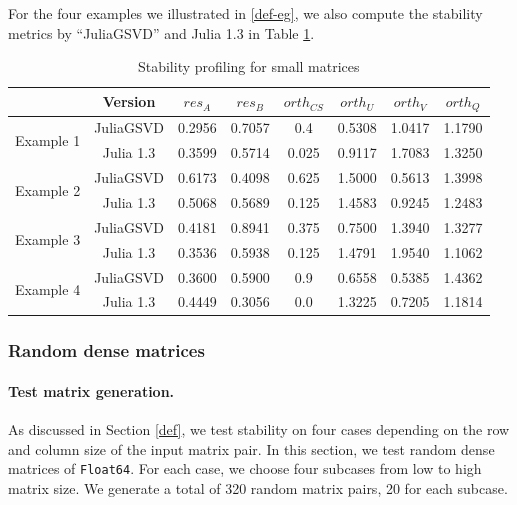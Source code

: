     For the four examples we illustrated in \ref{def-eg}, we also compute the stability metrics by ``JuliaGSVD'' and Julia 1.3 in Table \ref{tab:sta_test_1}.
        \begin{table}[H]
        \centering
        \begin{tabular}{||c | c || c | c | c | c | c | c||} 
         \hline
         & Version & $res_A$ & $res_B$ & $orth_{CS}$ & $orth_U$ & $orth_V$ & $orth_Q$ \\ [0.5ex] 
         \hline\hline
         \multirow{2}{5em}{Example 1} & JuliaGSVD & 0.2956 & 0.7057 & 0.4 & 0.5308 & 1.0417 & 1.1790 \\ 
         & Julia 1.3 & 0.3599 & 0.5714 & 0.025 & 0.9117 & 1.7083 & 1.3250 \\
        \hline\hline
        \multirow{2}{5em}{Example 2} & JuliaGSVD & 0.6173 & 0.4098 & 0.625 & 1.5000 & 0.5613 & 1.3998 \\ 
         & Julia 1.3 & 0.5068 & 0.5689 & 0.125 & 1.4583 & 0.9245 & 1.2483 \\
        \hline\hline
        \multirow{2}{5em}{Example 3} & JuliaGSVD & 0.4181 & 0.8941 & 0.375 & 0.7500 & 1.3940 & 1.3277 \\ 
         & Julia 1.3 & 0.3536 & 0.5938 & 0.125 & 1.4791 & 1.9540 & 1.1062\\
        \hline\hline
        \multirow{2}{5em}{Example 4} & JuliaGSVD & 0.3600 & 0.5900 & 0.9 & 0.6558 & 0.5385 & 1.4362 \\ 
         & Julia 1.3 & 0.4449 & 0.3056 & 0.0 & 1.3225 & 0.7205 & 1.1814 \\
        \hline\hline
        \end{tabular}
        \caption{Stability profiling for small matrices}
        \label{tab:sta_test_1}
        \end{table}
        
    \subsubsection{Random dense matrices}
        \paragraph{Test matrix generation.} As discussed in Section \ref{def}, we test stability on four cases depending on the row and column size of the input matrix pair. In this section, we test random dense matrices of \texttt{Float64}. For each case, we choose four subcases from low to high matrix size. We generate a total of 320 random matrix pairs, 20 for each subcase.
        
